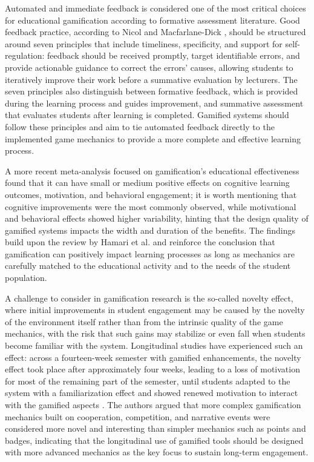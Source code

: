 Automated and immediate feedback is considered one of the most critical choices for educational gamification according to formative assessment literature. Good feedback practice, according to Nicol and Macfarlane-Dick \cite{nicol2006formative}, should be structured around seven principles that include timeliness, specificity, and support for self-regulation: feedback should be received promptly, target identifiable errors, and provide actionable guidance to correct the errors' causes, allowing students to iteratively improve their work before a summative evaluation by lecturers. The seven principles also distinguish between formative feedback, which is provided during the learning process and guides improvement, and summative assessment that evaluates students after learning is completed. Gamified systems should follow these principles and aim to tie automated feedback directly to the implemented game mechanics to provide a more complete and effective learning process.

A more recent meta-analysis focused on gamification's educational effectiveness \cite{sailer2020gamification} found that it can have small or medium positive effects on cognitive learning outcomes, motivation, and behavioral engagement; it is worth mentioning that cognitive improvements were the most commonly observed, while motivational and behavioral effects showed higher variability, hinting that the design quality of gamified systems impacts the width and duration of the benefits. The findings build upon the review by Hamari et al. \cite{hamari2014does} and reinforce the conclusion that gamification can positively impact learning processes as long as mechanics are carefully matched to the educational activity and to the needs of the student population.

A challenge to consider in gamification research is the so-called novelty effect, where initial improvements in student engagement may be caused by the novelty of the environment itself rather than from the intrinsic quality of the game mechanics, with the risk that such gains may stabilize or even fall when students become familiar with the system. Longitudinal studies have experienced such an effect: across a fourteen-week semester with gamified enhancements, the novelty effect took place after approximately four weeks, leading to a loss of motivation for most of the remaining part of the semester, until students adapted to the system with a familiarization effect and showed renewed motivation to interact with the gamified aspects \cite{rodrigues2022gamification}. The authors argued that more complex gamification mechanics built on cooperation, competition, and narrative events were considered more novel and interesting than simpler mechanics such as points and badges, indicating that the longitudinal use of gamified tools should be designed with more advanced mechanics as the key focus to sustain long-term engagement.


